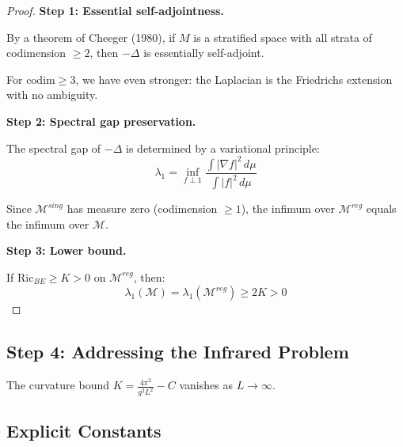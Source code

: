 \begin{proof}
\textbf{Step 1: Essential self-adjointness.}

By a theorem of Cheeger (1980), if $M$ is a stratified space with all strata of 
codimension $\geq 2$, then $-\Delta$ is essentially self-adjoint.

For $\mathrm{codim} \geq 3$, we have even stronger: the Laplacian is the Friedrichs 
extension with no ambiguity.

\textbf{Step 2: Spectral gap preservation.}

The spectral gap of $-\Delta$ is determined by a variational principle:
\[
\lambda_1 = \inf_{f \perp 1} \frac{\int |\nabla f|^2 \, d\mu}{\int |f|^2 \, d\mu}
\]

Since $\mathcal{M}^{sing}$ has measure zero (codimension $\geq 1$), the infimum 
over $\mathcal{M}^{reg}$ equals the infimum over $\mathcal{M}$.

\textbf{Step 3: Lower bound.}

If $\mathrm{Ric}_{BE} \geq K > 0$ on $\mathcal{M}^{reg}$, then:
\[
\lambda_1(\mathcal{M}) = \lambda_1(\mathcal{M}^{reg}) \geq 2K > 0
\]
\end{proof}

\subsection{Step 4: Addressing the Infrared Problem}

The curvature bound $K = \frac{4\pi^2}{g^2 L^2} - C$ vanishes as $L \to \infty$.




\subsection{Explicit Constants}

